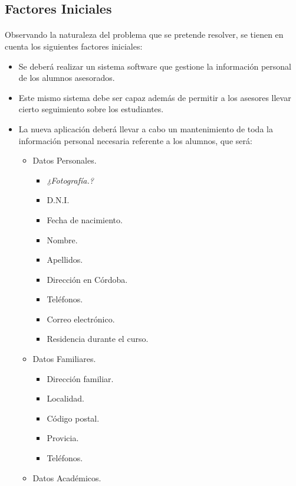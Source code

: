 \subsection{Factores Iniciales}

\paragraph{}Observando la naturaleza del problema que se pretende resolver, se
tienen en cuenta los siguientes factores iniciales:

\begin{itemize}
   \item Se deberá realizar un sistema software que gestione la información
   personal de los alumnos asesorados.
   \item Este mismo sistema debe ser capaz además de permitir a los asesores
   llevar cierto seguimiento sobre los estudiantes.
   \item La nueva aplicación deberá llevar a cabo un mantenimiento de toda la
   información personal necesaria referente a los alumnos, que será:
   \begin{itemize}
      \item Datos Personales.
      \begin{itemize}
         \item \textit{¿Fotografía.?}
         \item D.N.I.
         \item Fecha de nacimiento.
         \item Nombre.
         \item Apellidos.
         \item Dirección en Córdoba.
         \item Teléfonos.
         \item Correo electrónico.
         \item Residencia durante el curso.
      \end{itemize}
      \item Datos Familiares.
      \begin{itemize}
         \item Dirección familiar.
         \item Localidad.
         \item Código postal.
         \item Provicia.
         \item Teléfonos.
      \end{itemize}
      \item Datos Académicos.

\end{itemize}
\end{itemize}
